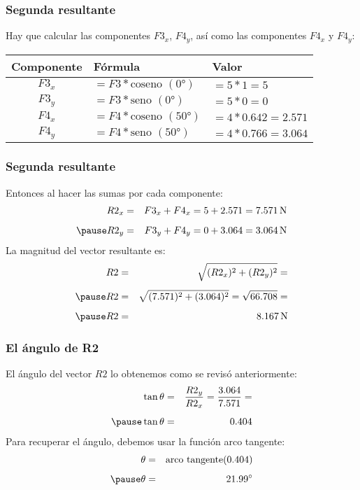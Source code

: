 \documentclass[14pt, xcolor={usenames,dvipsnames}]{beamer}
\begin{document}
\begin{frame}
\frametitle{Segunda resultante}
Hay que calcular las componentes $F3_{x}$, $F4_{y}$, así como las componentes $F4_{x}$ y $F4_{y}$:
\pause
\begin{table}
    \renewcommand{\arraystretch}{1.5}
\begin{tabular}{c | l | l}
Componente & Fórmula & Valor \\ \hline
$F3_{x}$ & $= F3 * \text{coseno } (\ang{0})$ & $= 5*1 = 5$ \\ \hline
$F3_{y}$ & $= F3 * \text{seno } (\ang{0})$ & $= 5*0 = 0$ \\ \hline
$F4_{x}$ & $= F4 * \text{coseno } (\ang{50})$ & $= 4*0.642 = 2.571$ \\ \hline
$F4_{y}$ & $= F4 * \text{seno } (\ang{50})$ & $= 4*0.766 = 3.064$ \\ \hline
\end{tabular}
\end{table}   
\end{frame}
\begin{frame}
\frametitle{Segunda resultante}
Entonces al hacer las sumas por cada componente:
\begin{eqnarray*}
R2_{x} &=& F3_{x} + F4_{x} = 5 + 2.571 = \SI{7.571}{\newton} \\[0.5em] \pause
R2_{y} &=& F3_{y} + F4_{y} = 0 + 3.064 = \SI{3.064}{\newton}
\end{eqnarray*}
\pause
La magnitud del vector resultante es:
\begin{eqnarray*}
R2 &=& \sqrt{(R2_{x})^{2} + (R2_{y})^{2}} = \\[0.5em] \pause
R2 &=& \sqrt{(7.571)^{2} + (3.064)^{2}} = \sqrt{66.708} = \\[0.5em] \pause
R2 &=& \SI{8.167}{\newton}
\end{eqnarray*}
\end{frame}
\begin{frame}
\frametitle{El ángulo de R2}
El ángulo del vector $R2$ lo obtenemos como se revisó anteriormente:
\begin{eqnarray*}
\tan \theta &=& \dfrac{R2_{y}}{R2_{x}} = \dfrac{3.064}{7.571} = \\[0.5em] \pause
\tan \theta &=& 0.404
\end{eqnarray*}
\pause
Para recuperar el ángulo, debemos usar la función arco tangente:
\begin{eqnarray*}
\theta &=& \text{arco tangente} (0.404) \\[0.5em] \pause
\theta &=& \ang{21.99}
\end{eqnarray*}
\end{frame}
\end{document}
